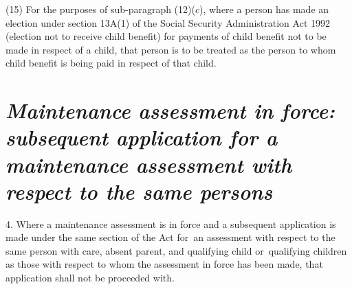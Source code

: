 \documentclass[a4paper,12pt]{article}
\begin{document}
(15) For the purposes of sub-paragraph (12)($c$), where a person has made an election under section 13A(1) of the Social Security Administration Act 1992 (election not to receive child benefit) for payments of child benefit not to be made in respect of a child, that person is to be treated as the person to whom child benefit is being paid in respect of that child.


\section*{\itshape\sloppy Maintenance assessment in force: subsequent application for a maintenance assessment with respect to the same persons}

4.  Where a maintenance assessment is in force and a subsequent application is made under the same section of the Act for~an assessment with respect to the same person with care, absent parent, and qualifying child or~qualifying children as those with respect to whom the assessment in force has been made, that application shall not be proceeded with. 


%
\end{document}
